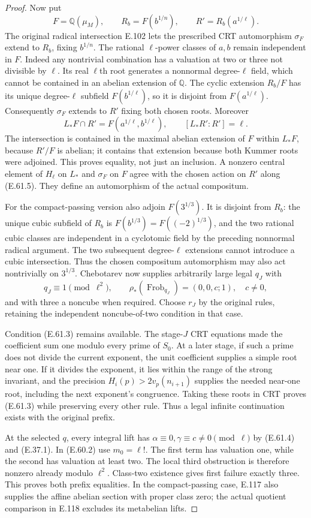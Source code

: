 \begin{proof}
Now put
\[
 F=\mathbb Q(\mu_M),\qquad
 R_b=F(b^{1/n}),\qquad
 R'=R_b(a^{1/\ell}).
\]
The original radical intersection E.102 lets
the prescribed CRT automorphism $\sigma_F$
extend to $R_b$, fixing $b^{1/n}$.
The rational $\ell$-power classes of $a,b$
remain independent in $F$. Indeed any nontrivial
combination has a valuation at two or three
not divisible by $\ell$. Its real $\ell$th
root generates a nonnormal degree-$\ell$
field, which cannot be contained in an
abelian extension of $\mathbb Q$.
The cyclic extension $R_b/F$ has its unique
degree-$\ell$ subfield $F(b^{1/\ell})$,
so it is disjoint from $F(a^{1/\ell})$.
Consequently $\sigma_F$ extends to $R'$
fixing both chosen roots. Moreover
\[
 L_*F\cap R'=F(a^{1/\ell},b^{1/\ell}),
 \qquad [L_*R':R']=\ell .
 \tag{E.61.5}
\]
The intersection is contained in the maximal
abelian extension of $F$ within $L_*F$,
because $R'/F$ is abelian; it contains that
extension because both Kummer roots were adjoined.
This proves equality, not just an inclusion.
A nonzero central element of $H_\ell$ on
$L_*$ and $\sigma_F$ on $F$ agree with the
chosen action on $R'$ along (E.61.5).
They define an automorphism of the actual
compositum.

For the compact-passing version also adjoin
$F(3^{1/3})$. It is disjoint from $R_b$:
the unique cubic subfield of $R_b$ is
$F(b^{1/3})=F((-2)^{1/3})$, and the two
rational cubic classes are independent in a
cyclotomic field by the preceding nonnormal
radical argument. The two subsequent
degree-$\ell$ extensions cannot introduce a
cubic intersection. Thus the chosen compositum
automorphism may also act nontrivially on
$3^{1/3}$. Chebotarev now supplies arbitrarily
large legal $q_J$ with
\[
 q_J\equiv1\pmod{\ell^2},\qquad
 \rho_*(\operatorname{Frob}_{q_J})
                     =(0,0,c;1),\quad c\ne0,
 \tag{E.61.6}
\]
and with three a noncube when required.
Choose $r_J$ by the original rules, retaining
the independent noncube-of-two condition in
that case.

Condition (E.61.3) remains available. The
stage-$J$ CRT equations made the coefficient
sum one modulo every prime of $S_0$.
At a later stage, if such a prime does not
divide the current exponent, the unit
coefficient supplies a simple root near one.
If it divides the exponent, it lies within
the range of the strong invariant, and the
precision $H_i(p)>2v_p(n_{i+1})$ supplies
the needed near-one root, including the next
exponent's congruence. Taking these roots
in CRT proves (E.61.3) while preserving
every other rule. Thus a legal infinite
continuation exists with the original prefix.

At the selected $q$, every integral lift has
$\alpha\equiv0,\gamma\equiv c\ne0\pmod\ell$
by (E.61.4) and (E.37.1).
In (E.60.2) use $m_0=\ell!$.
The first term has valuation one, while
the second has valuation at least two.
The local third obstruction is therefore
nonzero already modulo $\ell^2$.
Class-two existence gives first failure
exactly three. This proves both prefix
equalities. In the compact-passing case,
E.117 also supplies the affine abelian
section with proper class zero; the actual
quotient comparison in E.118 excludes its
metabelian lifts.
\end{proof}

